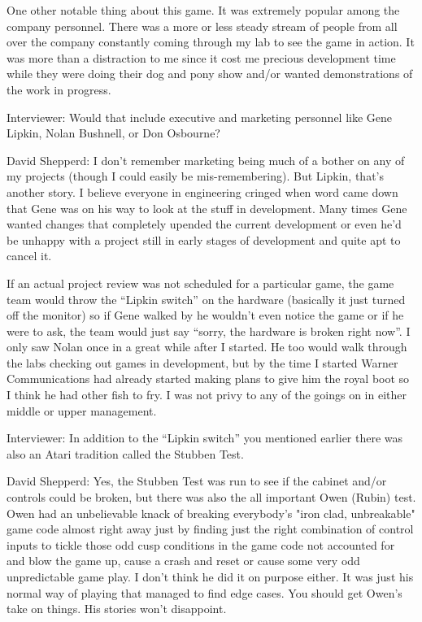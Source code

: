 One other notable thing about this game. It was extremely popular among the company personnel. There was a more or less steady stream of people from all over the company constantly coming through my lab to see the game in action. It was more than a distraction to me since it cost me precious development time while they were doing their dog and pony show and/or wanted demonstrations of the work in progress.

\textcolor{interviewer}{Interviewer:} Would that include executive and marketing personnel like Gene Lipkin, Nolan Bushnell, or Don Osbourne?

\textcolor{interviewee}{David Shepperd:} I don't remember marketing being much of a bother on any of my projects (though I could easily be mis-remembering). But Lipkin, that's another story. I believe everyone in engineering cringed when word came down that Gene was on his way to look at the stuff in development. Many times Gene wanted changes that completely upended the current development or even he'd be unhappy with a project still in early stages of development and quite apt to cancel it. 

If an actual project review was not scheduled for a particular game, the game team would throw the “Lipkin switch” on the hardware (basically it just turned off the monitor) so if Gene walked by he wouldn't even notice the game or if he were to ask, the team would just say “sorry, the hardware is broken right now”. I only saw Nolan once in a great while after I started. He too would walk through the labs checking out games in development, but by the time I started Warner Communications had already started making plans to give him the royal boot so I think he had other fish to fry. I was not privy to any of the goings on in either middle or upper management. 

\textcolor{interviewer}{Interviewer:} In addition to the “Lipkin switch” you mentioned earlier there was also an Atari tradition called the Stubben Test.

\textcolor{interviewee}{\textcolor{interviewee}{David Shepperd:}} Yes, the Stubben Test was run to see if the cabinet and/or controls could be broken, but there was also the all important Owen (Rubin) test. Owen had an unbelievable knack of breaking everybody's "iron clad, unbreakable" game code almost right away just by finding just the right combination of control inputs to tickle those odd cusp conditions in the game code not accounted for and blow the game up, cause a crash and reset or cause some very odd unpredictable game play. I don't think he did it on purpose either. It was just his normal way of playing that managed to find edge cases. You should get Owen's take on things. His stories won't disappoint. 

